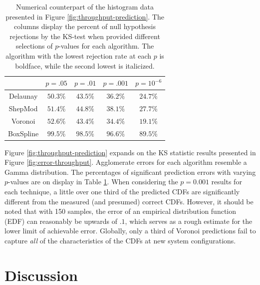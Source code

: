 \documentclass[smallextended,final]{svjour3}  %
\begin{document}
\begin{table}
  \renewcommand{\arraystretch}{1.3}
  \centering
  \begin{tabular}{c|c|c|c|c}
     & $p = .05$ & $p = .01$ & $p = .001$ & $p = 10^{-6}$\\
    \hline
    Delaunay & $\mathbf{50.3}\%$ & $\mathit{43.5}\%$ & $\mathit{36.2}\%$ & $\mathit{24.7}\%$\\
    ShepMod & $\mathit{51.4}\%$ & $44.8\%$ & $38.1\%$ & $27.7\%$\\
    Voronoi & $52.6\%$ & $\mathbf{43.4}\%$ & $\mathbf{34.4}\%$ & $\mathbf{19.1}\%$\\
    BoxSpline & $99.5\%$ & $98.5\%$ & $96.6\%$ & $89.5\%$\\
  \end{tabular}
  \caption{Numerical counterpart of the histogram data presented in
    Figure \ref{fig:throughput-prediction}. The columns display the
    percent of null hypothesis rejections by the KS-test when provided
    different selections of $p$-values for each algorithm. The
    algorithm with the lowest rejection rate at each $p$ is boldface,
    while the second lowest is italicized.}
  \label{table:null-hypothesis-results}
\end{table}



Figure \ref{fig:throughput-prediction} expands on the KS statistic
results presented in Figure \ref{fig:error-throughput}. Agglomerate
errors for each algorithm resemble a Gamma distribution. The
percentages of significant prediction errors with varying $p$-values
are on display in Table \ref{table:null-hypothesis-results}. When
considering the $p=0.001$ results for each technique, a little over
one third of the predicted CDFs are significantly different from the
measured (and presumed) correct CDFs. However, it should be noted that
with 150 samples, the error of an empirical distribution function
(EDF) can reasonably be upwards of $.1$, which serves as a rough
estimate for the lower limit of achievable error. Globally, only a
third of Voronoi predictions fail to capture \textit{all} of the
characteristics of the CDFs at new system configurations.

\section{Discussion}
\label{sec:discussion}
\end{document}
